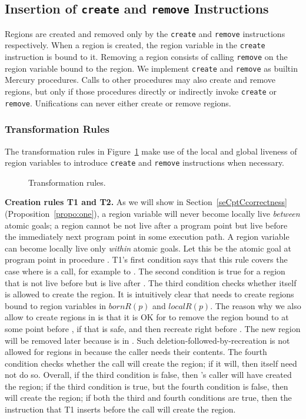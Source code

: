 \documentclass{tlp}
\newcommand{\bornR}[1]{\ensuremath{{bornR}(#1)}}
\newcommand{\localR}[1]{\ensuremath{{localR}(#1)}}
\newcommand{\code}[1]{{\tt#1}}
\begin{document}
\subsection{Insertion of \code{create} and \code{remove} Instructions}

Regions are created and removed
only by the \code{create} and \code{remove} instructions respectively.
When a region is created,
the region variable in the \code{create} instruction is bound to it.
Removing a region consists of
calling \code{remove} on the region variable bound to the region.
We implement \code{create} and \code{remove}
as builtin Mercury procedures.
Calls to other procedures may also create and remove regions,
but only if those procedures directly or indirectly invoke
\code{create} or \code{remove}.
Unifications can never either create or remove regions.

\subsubsection{Transformation Rules}

The transformation rules in Figure~\ref{fig:transformationrules}
make use of the local and global liveness of region variables
to introduce \code{create} and \code{remove} instructions
when necessary.

\begin{figure}
    \centering
    \scriptsize
    \framebox{
     }
\small
\caption{Transformation rules.}
\normalsize
\label{fig:transformationrules}
\end{figure}

\noindent\textbf{Creation rules T1 and T2.}
As we will show in Section~\ref{seCptCcorrectness}
(Proposition~\ref{propo:one}),
a region variable will never become locally live \emph{between} atomic goals;
a region cannot be not live after a program point
but live before the immediately next program point in some execution path.
A region variable can become locally live only \emph{within} atomic goals.
Let this be the atomic goal  at program point  in procedure .
T1's first condition says that this rule covers the case
where  is a call, for example to .
The second condition is true for a region 
that is not live before  but is live after .
The third condition checks whether  itself is allowed to create the region.
It is intuitively clear that  needs to create regions
bound to region variables in \bornR{p} and \localR{p}.
The reason why we also allow  to create regions in 
is that it is OK for  to remove the region bound to 
at some point before , if that is safe,
and then recreate  right before .
The new region will be removed later because  is in .
Such deletion-followed-by-recreation
is not allowed for regions in 
because the caller needs their contents.
The fourth condition checks whether the call will create the region;
if it will, then  itself need not do so.
Overall, if the third condition is false,
then 's caller will have created the region;
if the third condition is true,
but the fourth condition is false,
then  will create the region;
if both the third and fourth conditions are true,
then the instruction that T1 inserts before the call will create the region.
\end{document}
